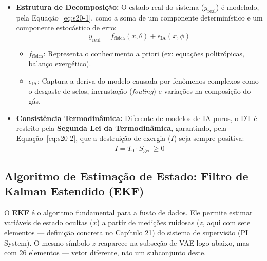 \documentclass[12pt,a4paper]{article}
\numberwithin{equation}{section}
\numberwithin{table}{section}
\numberwithin{figure}{section}
\begin{document}
	\begin{itemize}
		\item \textbf{Estrutura de Decomposição:}
		O estado real do sistema ($y_{\text{real}}$) é modelado, pela Equação~\eqref{eq:s20-1}, como a soma de um componente determinístico e um componente estocástico de erro:
		\begin{equation}\label{eq:s20-1}
 y_{\text{real}} = f_{\text{física}}(x, \theta) + \epsilon_{\text{IA}}(x, \phi) 
\end{equation}
		\begin{itemize}
			\item $f_{\text{física}}$: Representa o conhecimento a priori (ex: equações politrópicas, balanço exergético).
			\item $\epsilon_{\text{IA}}$: Captura a deriva do modelo causada por fenômenos complexos como o desgaste de selos, incrustação (\textit{fouling}) e variações na composição do gás.
		\end{itemize}
		
		\item \textbf{Consistência Termodinâmica:}
		Diferente de modelos de IA puros, o DT é restrito pela \textbf{Segunda Lei da Termodinâmica}, garantindo, pela Equação~\eqref{eq:s20-2}, que a destruição de exergia ($\dot{I}$) seja sempre positiva:
		\begin{equation}\label{eq:s20-2}
 \dot{I} = T_0 \cdotp \dot{S}_{\text{gen}} \ge 0 
\end{equation}
	\end{itemize}
	
	\subsection{Algoritmo de Estimação de Estado: Filtro de Kalman Estendido (EKF)}
	
	O \textbf{EKF} é o algoritmo fundamental para a fusão de dados. Ele permite estimar variáveis de estado ocultas ($x$) a partir de medições ruidosas ($z$, aqui com sete elementos — definição concreta no Capítulo 21) do sistema de supervisão (PI System). O mesmo símbolo $z$ reaparece na subseção de VAE logo abaixo, mas com 26 elementos — vetor diferente, não um subconjunto deste.
	
\end{document}
